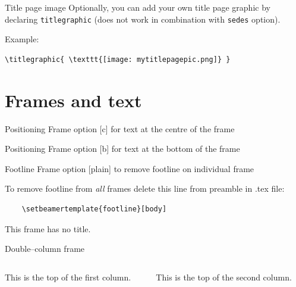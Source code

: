\documentclass[11pt,t]{beamer}
\begin{document}
\begin{frame}[fragile]{Title page image}
Optionally, you can add your own title page graphic by declaring \texttt{titlegraphic} (does not work in combination with \texttt{sedes} option).

\vspace{24pt}
Example:
	\begin{verbatim}
\titlegraphic{ \texttt{[image: mytitlepagepic.png]} }
	\end{verbatim}
\end{frame}







\section{Frames and text}
\begin{frame}[c]{Positioning}
Frame option [c] for text at the centre of the frame
\end{frame}




\begin{frame}[b]{Positioning}
Frame option [b] for text at the bottom of the frame
\vspace{8mm} %
\end{frame}




\begin{frame}{Footline}   %
\vspace{2.1mm} %
Frame option [plain] to remove footline on individual frame

\vspace{25pt}
To remove footline from \emph{all} frames delete this line from preamble in .tex file: 
	\begin{verbatim}
	\setbeamertemplate{footline}[body]
	\end{verbatim}
\end{frame}




\begin{frame}
	This frame has no title.
\end{frame}




\begin{frame}{Double--column frame}
	\begin{columns}[t]
		\begin{column}{.5\textwidth}
			This is the top of the first column.	
		\end{column}
		\begin{column}{.5\textwidth}
			This is the top of the second column.
		\end{column}
	\end{columns}	
\end{frame}
\end{document}
